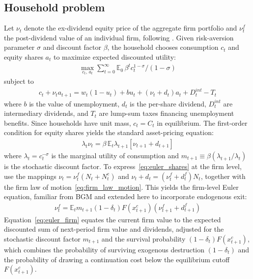 \documentclass[authoryear, review, 12pt]{elsarticle}
\begin{document}
	\subsection{Household problem}
	
	Let $\nu_t$ denote the ex-dividend equity price of the aggregate 
	firm portfolio and $\nu_t^f$ the post-dividend value of an 
	individual firm, following \citet{bilbiie_2012}. Given 
	risk-aversion parameter $\sigma$ and discount factor $\beta$, 
	the household chooses consumption $c_t$ and equity shares $a_t$ 
	to maximize expected discounted utility:
	\begin{align}
		\max_{c_t,\,a_t}\sum_{t=0}^{\infty}
		\mathbb{E}_0\,\beta^t c_t^{1-\sigma}/(1-\sigma)
	\end{align}
	subject to
	\begin{align}\label{eq:bc_HH}
		c_t + \nu_t a_{t+1} = w_t(1-u_t) + b u_t 
		+ (\nu_t+d_t)a_t + D_t^{int} - T_t
	\end{align}
	where $b$ is the value of unemployment, $d_t$ is the per-share 
	dividend, $D_t^{int}$ are intermediary dividends, and $T_t$ are 
	lump-sum taxes financing unemployment benefits. Since households 
	have unit mass, $c_t = C_t$ in equilibrium. The first-order 
	condition for equity shares yields the standard asset-pricing 
	equation:
	\begin{align}\label{eq:euler_shares}
		\lambda_t \nu_t = \beta\,\mathbb{E}_t\lambda_{t+1}
		[\nu_{t+1}+d_{t+1}]
	\end{align}
	where $\lambda_t = c_t^{-\sigma}$ is the marginal utility of 
	consumption and $m_{t+1}\equiv\beta(\lambda_{t+1}/\lambda_t)$ 
	is the stochastic discount factor. To express~\eqref{eq:euler_shares} 
	at the firm level, use the mappings $\nu_t=\nu_t^f(N_t+N_t^e)$ 
	and $\nu_t+d_t=(\nu_t^f+d_t^f)N_t$, together with the firm law 
	of motion~\eqref{eq:firm_law_motion}. This yields the firm-level 
	Euler equation, familiar from BGM and extended here to 
	incorporate endogenous exit:
	\begin{align}\label{eq:euler_firm}
		\nu_t^f = \mathbb{E}_t m_{t+1}(1-\delta_t)F(x_{t+1}^c)
		(\nu_{t+1}^f+d_{t+1}^f)
	\end{align}
	Equation~\eqref{eq:euler_firm} equates the current firm value to 
	the expected discounted sum of next-period firm value and 
	dividends, adjusted for the stochastic discount factor 
	$m_{t+1}$ and the survival probability $(1-\delta_t)F(x_{t+1}^c)$, 
	which combines the probability of surviving exogenous destruction 
	$(1-\delta_t)$ and the probability of drawing a continuation 
	cost below the equilibrium cutoff $F(x_{t+1}^c)$.
	
\end{document}
